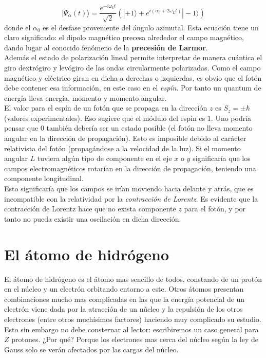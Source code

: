 \documentclass[12pt]{article}
\newcommand{\parentesis}[1]{\left( #1  \right)}
\begin{document}
\begin{equation}
| \Psi_{\alpha} (t) \rangle = \dfrac{e^{-i \omega_1 t}}{\sqrt{2}} \parentesis{ | + 1 \rangle + e^{i (\alpha_0 + 2 \omega_L t)} | - 1\rangle}
\end{equation}
donde el $\alpha_0$ es el desfase proveniente del ángulo azimutal. Esta ecuación tiene un claro significado: el dipolo magnético precesa alrededor el campo magnético, dando lugar al conocido fenómeno  de la \textbf{precesión de Larmor}. \\

Además el estado de polarización lineal permite interpretar de manera cuántica el giro dextrógiro y levógiro de las ondas circularmente polarizadas. Como el campo magnético y eléctrico giran en dicha a derechas o izquierdas, es obvio que el fotón debe contener esa información, en este caso en el \textit{espín}. Por tanto un quantum de energía lleva energía, momento y momento angular. \\

El valor para el espín de un fotón que se propaga en la dirección $z$ es $S_z = \pm \hbar$ (valores experimentales). Eso sugiere que el módulo del espín es $1$. Uno podría pensar que $0$ también debería ser un estado posible (el fotón no lleva momento angular en la dirección de propagación). Esto es imposible debido al carácter relativista del fotón (propagándose a la velocidad de la luz). Si el momento angular $L$ tuviera algún tipo de componente en el eje $x$ o $y$ significaría que los campos electromagnéticos rotarían en la dirección de propagación, teniendo una componente longitudinal. \\

Esto significaría que los campos se irían moviendo hacia delante y atrás, que es incompatible con la relatividad por la \textit{contracción de Lorentz}. Es evidente que la contracción de Lorentz hace que no exista componente $z$ para el fotón, y por tanto no pueda existir una oscilación en dicha dirección. 


\section{El átomo de hidrógeno}

El átomo de hidrógeno es el átomo mas sencillo de todos, constando de un protón en el núcleo y un electrón orbitando entorno a este. Otros átomos presentan combinaciones mucho mas complicadas en las que la energía potencial de un electrón viene dada por la atracción de un núcleo y la repulsión de los otros electrones (entre otros muchísimos factores) haciendo muy complicado su estudio. Esto sin embargo no debe consternar al lector: escribiremos un caso general para $Z$ protones. ¿Por qué? Porque los electrones mas cerca del núcleo según la ley de Gauss solo se verán afectados por las cargas del núcleo. \\
\end{document}
